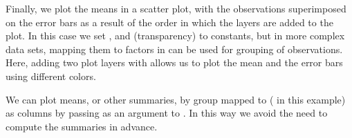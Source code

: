 \documentclass[krantz2]{krantz}\usepackage{knitr}
\begin{document}
Finally, we plot the means in a scatter plot, with the observations superimposed on the error bars as a result of the order in which the layers are added to the plot. In this case we set ,  and  (transparency) to constants, but in more complex data sets, mapping them to factors in  can be used for grouping of observations. Here, adding two plot layers with  allows us to plot the mean and the error bars using different colors.

\begin{knitrout}\footnotesize
{}\color{fgcolor}\begin{kframe}
\begin{alltt}
\hlstd{(}  \hlstd{(}    \hlopt{+}
  \hlstd{(} \hlstd{=} \hlstd{,}  \hlstd{=} \hlstd{,}
                \hlstd{=} \hlstd{,}  \hlstd{=} \hlstd{)} \hlopt{+}
  \hlstd{(} \hlstd{=} \hlstd{,}
                \hlstd{=} \hlstd{,}
                \hlstd{=} \hlstd{,}  \hlstd{=} \hlstd{,}  \hlstd{=} \hlstd{)} \hlopt{+}
  \hlstd{(} \hlstd{=} \hlstd{,}  \hlstd{=} \hlstd{)}
\end{alltt}
\end{kframe}
\end{knitrout}

We can plot means, or other summaries, by group mapped to  ( in this example) as columns by passing  as an argument to  . In this way we avoid the need to compute the summaries in advance.
\end{document}
